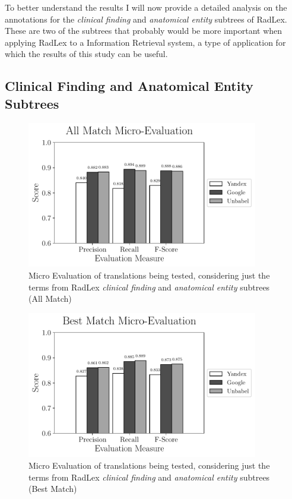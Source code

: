 To better understand the results I will now provide a detailed analysis on the annotations for the \textit{clinical finding} and \textit{anatomical entity} subtrees of RadLex. These are two of the subtrees that probably would be more important when applying RadLex to a Information Retrieval system, a type of application for which the results of this study can be useful.

\subsection{Clinical Finding and Anatomical Entity Subtrees}

\begin{figure}
	\centering
	\includegraphics[width=0.9\textwidth]{SupportFiles/plots/all_match_micro_clinical_anatomical_subtrees_plot.pdf}
	\caption{Micro Evaluation of translations being tested, considering just the terms from RadLex \textit{clinical finding} and \textit{anatomical entity} subtrees (All Match)}
	\label{fig:micro_eval_subtrees_all}
\end{figure}


\begin{figure}
	\centering
	\includegraphics[width=0.9\textwidth]{SupportFiles/plots/best_match_micro_clinical_anatomical_subtrees_plot.pdf}
	\caption{Micro Evaluation of translations being tested, considering just the terms from RadLex \textit{clinical finding} and \textit{anatomical entity} subtrees (Best Match)}
	\label{fig:micro_eval_subtrees_best}
\end{figure}


